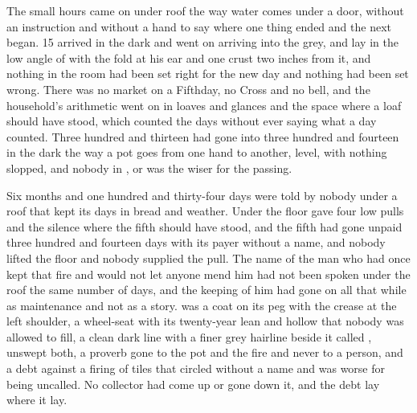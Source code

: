 
The small hours came on under  roof the way water comes under a door, without an instruction and without a hand to say where one thing ended and the next began.  15 arrived in the dark and went on arriving into the grey, and  lay in the low angle of  with the fold at his ear and one crust two inches from it, and nothing in the room had been set right for the new day and nothing had been set wrong. There was no market on a Fifthday, no Cross and no bell, and the household's arithmetic went on in loaves and glances and the space where a loaf should have stood, which counted the days without ever saying what a day counted. Three hundred and thirteen had gone into three hundred and fourteen in the dark the way a pot goes from one hand to another, level, with nothing slopped, and nobody in ,  or  was the wiser for the passing.

Six months and one hundred and thirty-four days were told by nobody under a roof that kept its days in bread and weather. Under the floor  gave four low pulls and the silence where the fifth should have stood, and the fifth had gone unpaid three hundred and fourteen days with its payer without a name, and nobody lifted the floor and nobody supplied the pull. The name of the man who had once kept that fire and would not let anyone mend him had not been spoken under the roof the same number of days, and the keeping of him had gone on all that while as maintenance and not as a story.  was a coat on its peg with the crease at the left shoulder, a wheel-seat with its twenty-year lean and hollow that nobody was allowed to fill, a clean dark line with a finer grey hairline beside it called , unswept both, a proverb gone to the pot and the fire and never to a person, and a debt against a firing of tiles that circled without a name and was worse for being uncalled. No collector had come up  or gone down it, and the debt lay where it lay.

